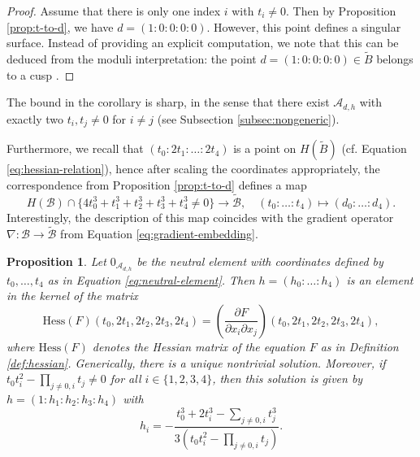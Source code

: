 \documentclass[11pt]{amsart}
\newtheorem{proposition}[theorem]{Proposition}
\theoremstyle{definition}
\newcommand{\B}{\mathcal{B}}
\newcommand{\A}{\mathcal{A}}
\begin{document}
\begin{proof}
	Assume that there is only one index $i$ with $t_i \neq 0$. Then by Proposition \ref{prop:t-to-d}, we have $d = (1 : 0 : 0 : 0: 0)$. However, this point defines a singular surface. Instead of providing an explicit computation, we note that this can be deduced from the moduli interpretation: the point $d = (1:0:0:0:0) \in \tilde{B}$ belongs to a cusp \cite[Section 5]{freitag2004burkhardt1}.
\end{proof}

The bound in the corollary is sharp, in the sense that there exist $\A_{d,h}$ with exactly two $t_i, t_j \neq 0$ for $i\neq j$ (see Subsection \ref{subsec:nongeneric}). 

Furthermore, we recall that $(t_0:2t_1: \dots :2t_4)$ is a point on $H(\tilde{B})$ (cf. Equation \ref{eq:hessian-relation}), hence after scaling the coordinates appropriately, the correspondence from Proposition \ref{prop:t-to-d}  defines a map 
\[
H(\B)\cap \{4 t_0^3 + t_1^3 + t_2^3 + t_3^3 + t_4^3 \neq 0\} \to \tilde{\B}, \quad (t_0: \dots: t_4) \mapsto (d_0: \dots: d_4).
\] Interestingly, the description of this map coincides with the gradient operator $\nabla: \B \to \tilde{\B}$ from Equation \ref{eq:gradient-embedding}. 

\begin{proposition} \label{prop:t-to-h}
	Let $0_{\A_{d,h}}$ be the neutral element with coordinates defined by $t_0, \dots, t_4$ as in Equation \ref{eq:neutral-element}. Then $h= (h_0: \dots: h_4)$ is an element in the kernel of the matrix
    \[
    \text{Hess}(F)(t_0,2t_1,2t_2,2t_3,2t_4) = \left( \frac{\partial F}{\partial x_i \partial x_j}\right)(t_0,2t_1,2t_2,2t_3,2t_4),
    \]
    where $\text{Hess}(F)$ denotes the Hessian matrix of the equation $F$ as in Definition \ref{def:hessian}.
    Generically, there is a unique nontrivial solution. Moreover, if $t_0t_i^2 - \prod_{j\neq 0, i}t_j\neq 0$ for all $i\in\{1,2,3,4\}$, then this solution is given by $h = (1 : h_1:h_2:h_3:h_4)$ with
	\[
	h_i = -\frac{t_0^3 + 2t_i^3 - \sum_{j \neq 0,i}t_j^3}{3(t_0t_i^2 - \prod_{j\neq 0, i}t_j)}.
	\]
\end{proposition}
\end{document}
